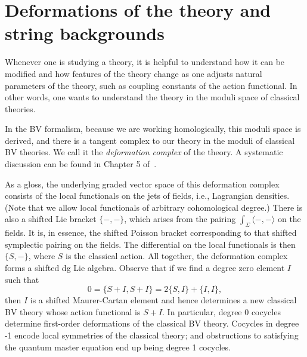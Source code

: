 \section{Deformations of the theory and string backgrounds}
\label{sec: moduli}




Whenever one is studying a theory,
it is helpful to understand how it can be modified 
and how features of the theory change as one adjusts natural parameters of the theory,
such as coupling constants of the action functional.
In other words, one wants to understand the theory in the moduli space of classical theories.

In the BV formalism, because we are working homologically, this moduli space is derived,
and there is a tangent complex to our theory in the moduli of classical BV theories.
We call it the {\em deformation complex} of the theory.
A systematic discussion can be found in Chapter 5 of~\cite{CosBook}.

As a gloss, the underlying graded vector space of this deformation complex consists of the local functionals on the jets of fields, i.e., Lagrangian densities.
(Note that we allow local functionals of arbitrary cohomological degree.) 
There is also a shifted Lie bracket $\{-,-\}$, 
which arises from the pairing $\int_\Sigma \langle-,-\rangle$ on the fields.
It is, in essence, the shifted Poisson bracket corresponding to that shifted symplectic pairing on the fields.
The differential on the local functionals is then $\{S,-\}$, where $S$ is the classical action. 
All together, the deformation complex forms a shifted dg Lie algebra. 
Observe that if we find a degree zero element $I$ such that
\[
0=\{S +I,S +I\}=2\{S,I\}+\{I,I\},
\]
then $I$ is a shifted Maurer-Cartan element and 
hence determines a new classical BV theory whose action functional is $S + I$. 
In particular, degree 0 cocycles determine first-order deformations of the classical BV theory. Cocycles in degree -1 encode local symmetries of the classical theory; 
and obstructions to satisfying the quantum master equation end up being degree 1 cocycles.

